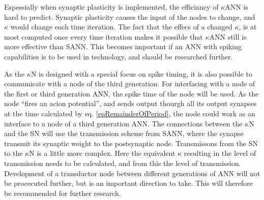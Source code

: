 Espessially when synaptic plasticity is implemented, the efficiancy of $\kappa$ANN is hard to predict.
Synaptic plasticity causes the input of the nodes to change, and $\kappa$ would change each time iteration.
The fact that the effecs of a changed $\kappa$, is at most computed once every time iteration makes it possible that $\kappa$ANN still is more effective than SANN.
This becomes important if an ANN with spiking capabilities is to be used in technology, and should be researched further.






As the $\kappa$N is designed with a special focus on spike timing, it is also possible to communicate with a node of the third generation.
For interfacing with a node of the first or third generation ANN, the spike time of the node will be used. %
As the node ``fires an acion potential'', and sends output thourgh all its output synapses at the time calculated by eq. \eqref{eqRemainderOfPeriod}, the node could work as an interface to a node of a third generation ANN. 
The connections between the $\kappa$N and the SN will use the transmission scheme from SANN, where the synapse transmit its synaptic weight to the postsynaptic node. 
Transmissons from the SN to  the $\kappa$N is a little more complex. Here the equivalent $\kappa$ resulting in the level of transmission needs to be calculated, and from this the level of transmission.
Development of a transductor node between different generations of ANN will not be procecuted further, but is an important direction to take.
This will therefore be recommended for further research.

